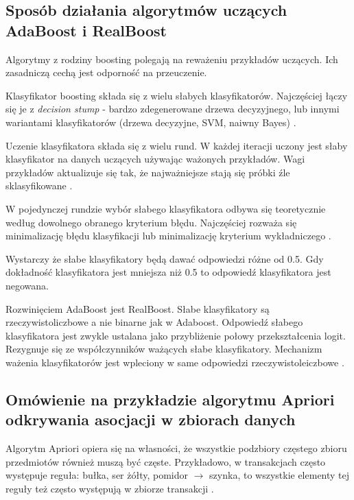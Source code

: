 \documentclass[wi]{zut}
\begin{document}
\subsection{Sposób działania algorytmów uczących AdaBoost i RealBoost}

Algorytmy z rodziny boosting polegają na reważeniu przykładów uczących. Ich zasadniczą cechą jest odporność na przeuczenie.

Klasyfikator boosting składa się z wielu słabych klasyfikatorów. Najczęściej łączy się je z \emph{decision stump} - bardzo zdegenerowane drzewa decyzyjnego, lub innymi wariantami klasyfikatorów (drzewa decyzyjne, SVM, naiwny Bayes) \cite{Klesk2020}.

Uczenie klasyfikatora składa się z wielu rund. W każdej iteracji uczony jest słaby klasyfikator na danych uczących używając ważonych przykładów. Wagi przykładów aktualizuje się tak, że najważniejsze stają się próbki źle sklasyfikowane \cite{Klesk2020}.

W pojedynczej rundzie wybór słabego klasyfikatora odbywa się teoretycznie według dowolnego obranego kryterium błędu. Najczęściej rozważa się minimalizację błędu klasyfikacji lub minimalizację kryterium wykładniczego \cite{Klesk2020}.

Wystarczy że słabe klasyfikatory będą dawać odpowiedzi różne od 0.5. Gdy dokładność klasyfikatora jest mniejsza niż 0.5 to odpowiedź klasyfikatora jest negowana.

Rozwinięciem AdaBoost jest RealBoost. Słabe klasyfikatory są rzeczywistoliczbowe a nie binarne jak w Adaboost. Odpowiedź słabego klasyfikatora jest zwykle ustalana jako przybliżenie połowy przekształcenia logit. Rezygnuje się ze współczynników ważących słabe klasyfikatory. Mechanizm ważenia klasyfikatorów jest wpleciony w same odpowiedzi rzeczywistoleiczbowe \cite{Klesk2020}.
\question


\subsection{Omówienie na przykładzie algorytmu Apriori odkrywania asocjacji w zbiorach danych}

Algorytm Apriori opiera się na własności, że wszystkie podzbiory częstego zbioru przedmiotów również muszą być częste. Przykładowo, w transakcjach często występuje reguła: bułka, ser żółty, pomidor $\rightarrow$ szynka, to wszystkie elementy tej reguły też często występują w zbiorze transakcji \cite{Kolodziejczyk2020}.
\end{document}
